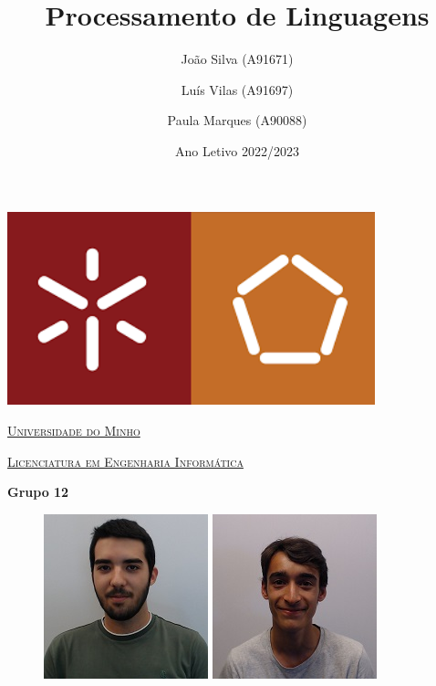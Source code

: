 \documentclass[a4paper]{report}
\title{Processamento de Linguagens}
\author{João Silva (A91671)
        \and Luís Vilas (A91697)
        \and Paula Marques (A90088)}
\date{Ano Letivo 2022/2023}
\begin{document}
\begin{minipage}{0.9\linewidth}
    \begin{center}
        \centering
        \includegraphics[width=0.8\textwidth]{imagens/uminho.png}\par\vspace{1cm}
        \href{https://www.uminho.pt/PT}
        {\scshape\LARGE Universidade do Minho} \par
        \vspace{0.6cm}
        \href{https://www.uminho.pt/PT/ensino/oferta-educativa/Cursos-Conferentes-a-Grau/_layouts/15/UMinho.PortalUM.UI/Pages/CatalogoCursoDetail.aspx?itemId=4079&catId=12}
        {\scshape\Large Licenciatura em Engenharia Informática} \par
        \vspace{1.3cm}
        \textbf{Grupo 12}
        \vspace{0.6cm}
        \maketitle
        \begin{figure}[H]
            \includegraphics[width=0.31\linewidth]{imagens/Aluno1.jpg}
            \includegraphics[width=0.31\linewidth]{imagens/Aluno2.png}

\end{figure}
\end{center}
\end{minipage}
\end{document}
